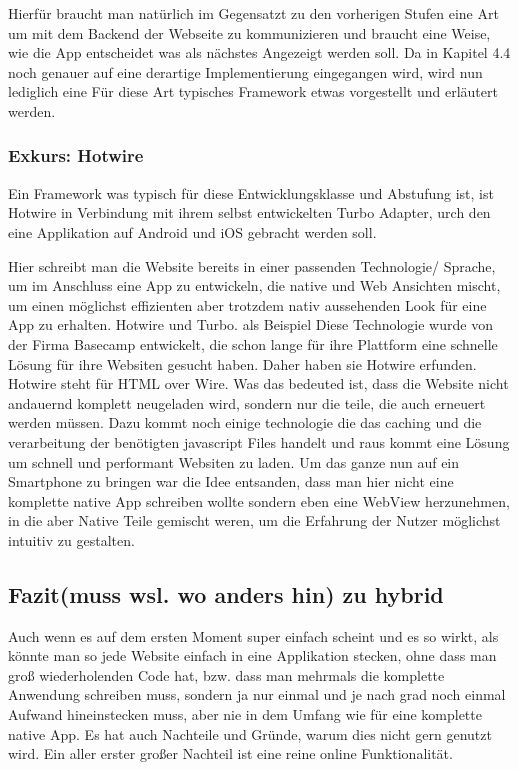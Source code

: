 Hierfür braucht man natürlich im Gegensatzt zu den vorherigen Stufen eine Art um mit dem Backend der Webseite zu kommunizieren und braucht eine Weise, wie die App entscheidet was als nächstes Angezeigt werden soll.
Da in Kapitel 4.4 noch genauer auf eine derartige Implementierung eingegangen wird, wird nun lediglich eine Für diese Art typisches Framework etwas vorgestellt und erläutert werden.

\subsubsection{Exkurs: Hotwire}
Ein Framework was typisch für diese Entwicklungsklasse und Abstufung ist, ist Hotwire in Verbindung mit ihrem selbst entwickelten Turbo Adapter, urch den eine Applikation auf Android und iOS gebracht werden soll.

Hier schreibt man die Website bereits in einer passenden Technologie/ Sprache, um im Anschluss eine App zu entwickeln, die native und Web Ansichten mischt, um einen möglichst effizienten aber trotzdem nativ aussehenden Look für eine App zu erhalten. Hotwire und Turbo. als Beispiel
Diese Technologie wurde von der Firma Basecamp entwickelt, die schon lange für ihre Plattform eine schnelle Lösung für ihre Websiten gesucht haben. Daher haben sie Hotwire erfunden. Hotwire steht für HTML over Wire. Was das bedeuted ist, dass die Website nicht andauernd komplett neugeladen wird, sondern nur die teile, die auch erneuert werden müssen. Dazu kommt noch einige technologie die das caching und die verarbeitung der benötigten javascript Files handelt und raus kommt eine Lösung um schnell und performant Websiten zu laden.
Um das ganze nun auf ein Smartphone zu bringen war die Idee entsanden, dass man hier nicht eine komplette native App schreiben wollte sondern eben eine WebView herzunehmen, in die aber Native Teile gemischt weren, um die Erfahrung der Nutzer möglichst intuitiv zu gestalten. 



\subsection{Fazit(muss wsl. wo anders hin) zu hybrid}
Auch wenn es auf dem ersten Moment super einfach scheint und es so wirkt, als könnte man so jede Website einfach in eine Applikation stecken, ohne dass man groß wiederholenden Code hat, bzw. dass man mehrmals die komplette Anwendung schreiben muss, sondern ja nur einmal und je nach grad noch einmal Aufwand hineinstecken muss, aber nie in dem Umfang wie für eine komplette native App. 
Es hat auch Nachteile und Gründe, warum dies nicht gern genutzt wird.
Ein aller erster großer Nachteil ist eine reine online Funktionalität. 